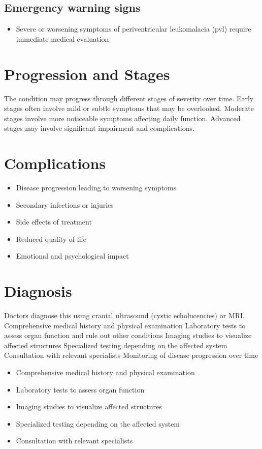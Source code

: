 \subsection{Emergency warning signs}
\begin{itemize}[noitemsep]
  \item Severe or worsening symptoms of periventricular leukomalacia (pvl) require immediate medical evaluation
\end{itemize}
\section{Progression and Stages}
The condition may progress through different stages of severity over time. Early stages often involve mild or subtle symptoms that may be overlooked. Moderate stages involve more noticeable symptoms affecting daily function. Advanced stages may involve significant impairment and complications.
\section{Complications}
\begin{itemize}[noitemsep]
  \item Disease progression leading to worsening symptoms
  \item Secondary infections or injuries
  \item Side effects of treatment
  \item Reduced quality of life
  \item Emotional and psychological impact
\end{itemize}
\section{Diagnosis}
Doctors diagnose this using cranial ultrasound (cystic echolucencies) or MRI. Comprehensive medical history and physical examination Laboratory tests to assess organ function and rule out other conditions Imaging studies to visualize affected structures Specialized testing depending on the affected system Consultation with relevant specialists Monitoring of disease progression over time

\begin{itemize}[noitemsep]
  \item Comprehensive medical history and physical examination
  \item Laboratory tests to assess organ function
  \item Imaging studies to visualize affected structures
  \item Specialized testing depending on the affected system
  \item Consultation with relevant specialists
\end{itemize}
